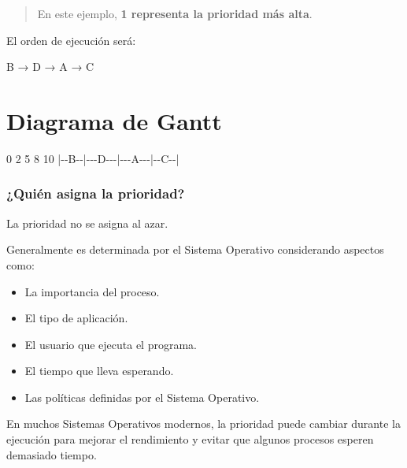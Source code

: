 \documentclass[
  spanish,
  letterpaper,
]{scrbook}
\newenvironment{Shaded}{\begin{snugshade}}{\end{snugshade}}
\newcommand{\NormalTok}[1]{\textcolor[rgb]{0.00,0.23,0.31}{#1}}
\providecommand{\tightlist}{%
  \setlength{\itemsep}{0pt}\setlength{\parskip}{0pt}}
\begin{document}
\begin{quote}
En este ejemplo, \textbf{1 representa la prioridad más alta}.
\end{quote}

El orden de ejecución será:

\begin{Shaded}
\begin{Highlighting}[]
\NormalTok{B → D → A → C}
\end{Highlighting}
\end{Shaded}


\chapter{Diagrama de Gantt}\label{diagrama-de-gantt-1}

\begin{Shaded}
\begin{Highlighting}[]
\NormalTok{0      2      5      8      10}
\NormalTok{|{-}{-}B{-}{-}|{-}{-}{-}D{-}{-}{-}|{-}{-}{-}A{-}{-}{-}|{-}{-}C{-}{-}|}
\end{Highlighting}
\end{Shaded}

\subsection{¿Quién asigna la
prioridad?}\label{quiuxe9n-asigna-la-prioridad}

La prioridad no se asigna al azar.

Generalmente es determinada por el Sistema Operativo considerando
aspectos como:

\begin{itemize}
\tightlist
\item
  La importancia del proceso.
\item
  El tipo de aplicación.
\item
  El usuario que ejecuta el programa.
\item
  El tiempo que lleva esperando.
\item
  Las políticas definidas por el Sistema Operativo.
\end{itemize}

En muchos Sistemas Operativos modernos, la prioridad puede cambiar
durante la ejecución para mejorar el rendimiento y evitar que algunos
procesos esperen demasiado tiempo.

\end{document}
